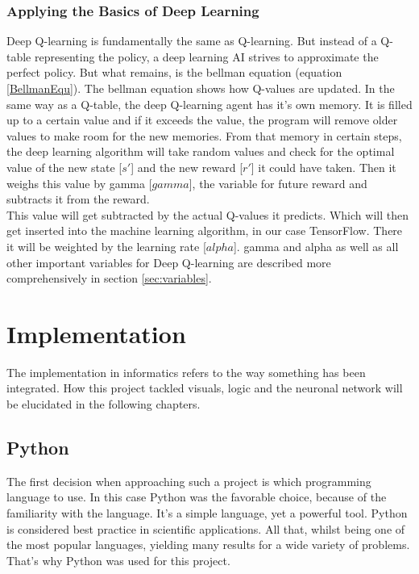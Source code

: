 \documentclass[12pt]{article}
\def\alpha{alpha}%
\def\gamma{gamma}%
\begin{document}
\subsubsection{Applying the Basics of Deep Learning}
\Gls{Deep Q-learning} is fundamentally the same as \gls{Q-learning}. But instead of a \gls{Q-table} representing the \gls{policy}, a \gls{deep learning} \gls{AI} strives to approximate the perfect \gls{policy}. But what remains, is the bellman equation (equation \ref{BellmanEqu}). The bellman equation shows how \glspl{Q-value} are updated. In the same way as a \gls{Q-table}, the deep \gls{Q-learning} agent has it's own \gls{memory}. It is filled up to a certain value and if it exceeds the value, the program will remove older values to make room for the new memories. From that \gls{memory} in certain steps, the \gls{deep learning} algorithm will take random values and check for the optimal value of the new \gls{state} [$s'$] and the new \gls{reward} [$r'$] it could have taken. Then it weighs this value by \gls{gamma} [$\gamma$], the variable for future \gls{reward} and subtracts it from the \gls{reward}. \cite{bellmanEquValue} \\
This value will get subtracted by the actual \glspl{Q-value} it predicts. Which will then get inserted into the \gls{machine learning} algorithm, in our case TensorFlow. There it will be weighted by the \gls{learning rate} [$\alpha$]. \Gls{gamma} and \gls{alpha} as well as all other important variables for \gls{Deep Q-learning} are described more comprehensively in section \ref{sec:variables}.

\section{Implementation}
The implementation in informatics refers to the way something has been integrated. How this project tackled visuals, logic and the neuronal network will be elucidated in the following chapters.
\subsection{Python}
The first decision when approaching such a project is which programming language to use. In this case Python \cite{Python} was the favorable choice, because of the familiarity with the language. It's a simple language, yet a powerful tool. Python is considered best practice in scientific applications. All that, whilst being one of the most popular languages, yielding many results for a wide variety of problems. That's why Python was used for this project. 
\end{document}
